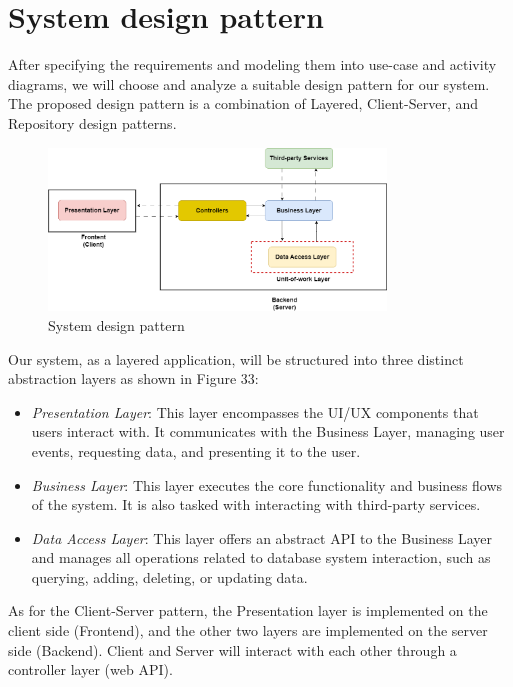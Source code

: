 \section{System design pattern}

After specifying the requirements and modeling them into use-case and activity diagrams, we will choose and analyze a suitable design pattern for our system. The proposed design pattern is a combination of Layered, Client-Server, and Repository design patterns.

\begin{figure}[H]
    \centering
    \includegraphics[width=0.8\textwidth]{Figures/design_pattern.png}
    \caption{System design pattern}
\end{figure}

Our system, as a layered application, will be structured into three distinct abstraction layers as shown in Figure 33:


\begin{itemize}
    \item
          \emph{Presentation Layer}: This layer encompasses the UI/UX components that users interact with. It communicates with the Business Layer, managing user events, requesting data, and presenting it to the user.
    \item
          \emph{Business Layer}: This layer executes the core functionality and business flows of the system. It is also tasked with interacting with third-party services.
    \item
          \emph{Data Access Layer}: This layer offers an abstract API to the Business Layer and manages all operations related to database system interaction, such as querying, adding, deleting, or updating data.
\end{itemize}

As for the Client-Server pattern, the Presentation layer is implemented on the client side (Frontend), and the other two layers are implemented on the server side (Backend). Client and Server will interact with each other through a controller layer (web API).


